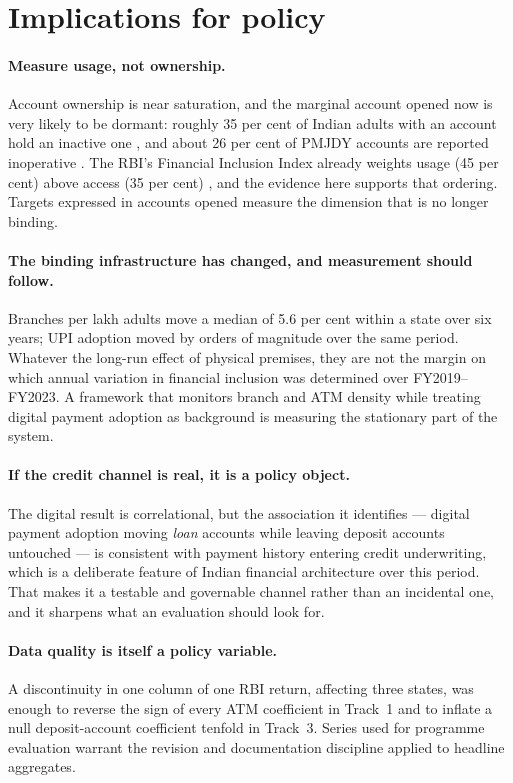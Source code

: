 \section{Implications for policy}
\label{sec:policy}

\paragraph{Measure usage, not ownership.} Account ownership is near saturation, and the marginal
account opened now is very likely to be dormant: roughly 35 per cent of Indian adults with an
account hold an inactive one \citep{findex2021}, and about 26 per cent of PMJDY accounts are
reported inoperative \citep{pmjdy2025}. The RBI's Financial Inclusion Index already weights usage
(45 per cent) above access (35 per cent) \citep{rbi_fiindex2025}, and the evidence here supports
that ordering. Targets expressed in accounts opened measure the dimension that is no longer
binding.

\paragraph{The binding infrastructure has changed, and measurement should follow.} Branches per
lakh adults move a median of 5.6 per cent within a state over six years; UPI adoption moved by
orders of magnitude over the same period. Whatever the long-run effect of physical premises, they
are not the margin on which annual variation in financial inclusion was determined over
FY2019--FY2023. A framework that monitors branch and ATM density while treating digital payment
adoption as background is measuring the stationary part of the system.

\paragraph{If the credit channel is real, it is a policy object.} The digital result is
correlational, but the association it identifies --- digital payment adoption moving \emph{loan}
accounts while leaving deposit accounts untouched --- is consistent with payment history entering
credit underwriting, which is a deliberate feature of Indian financial architecture over this
period. That makes it a testable and governable channel rather than an incidental one, and it
sharpens what an evaluation should look for.

\paragraph{Data quality is itself a policy variable.} A discontinuity in one column of one RBI
return, affecting three states, was enough to reverse the sign of every ATM coefficient in Track~1
and to inflate a null deposit-account coefficient tenfold in Track~3. Series used for programme
evaluation warrant the revision and documentation discipline applied to headline aggregates.


